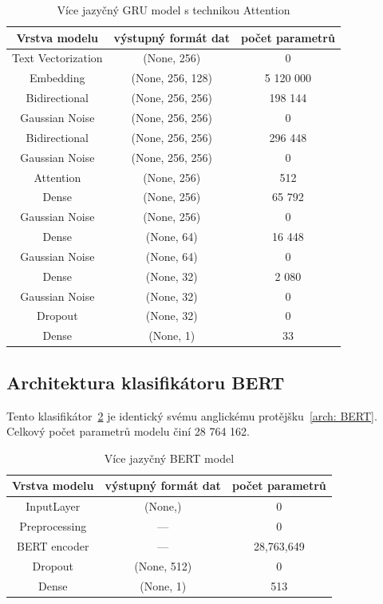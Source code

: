 \begin{table}[H]
	\centering
	\caption{Více jazyčný GRU model s technikou Attention}\label{tab:MULTI GRU Attention model}
	\begin{tabular}{ c c c }
			\toprule
			Vrstva modelu & výstupný formát dat & počet parametrů\\
			\midrule
            Text Vectorization & (None, 256) & 0\\         
            Embedding & (None, 256, 128) & 5 120 000\\   
            Bidirectional & (None, 256, 256) & 198 144\\    
			Gaussian Noise & (None, 256, 256) & 0\\
            Bidirectional & (None, 256, 256) & 296 448\\
			Gaussian Noise & (None, 256, 256) & 0\\
			Attention & (None, 256) & 512\\
            Dense & (None, 256) & 65 792\\ 
			Gaussian Noise & (None, 256) & 0\\
			Dense & (None, 64) & 16 448\\ 
			Gaussian Noise & (None, 64) & 0\\
			Dense & (None, 32) & 2 080\\ 
			Gaussian Noise & (None, 32) & 0\\
            Dropout & (None, 32) & 0\\   
            Dense & (None, 1) & 33\\ 
			\midrule
		\end{tabular}
\end{table}


\subsection{Architektura klasifikátoru BERT}
Tento klasifikátor~\ref{tab:MULTI BERT model} je identický svému anglickému protějšku~\ref{arch: BERT}.
Celkový počet parametrů modelu činí 28 764 162.

\begin{table}[H]
	\centering
	\caption{Více jazyčný BERT model}\label{tab:MULTI BERT model}
	\begin{tabular}{ c c c }
			\toprule
			Vrstva modelu & výstupný formát dat & počet parametrů\\
			\midrule
            InputLayer & (None,) & 0\\         
            Preprocessing & --- & 0\\   
            BERT encoder & --- & 28,763,649\\    
            Dropout & (None, 512) & 0\\  
            Dense & (None, 1) & 513\\ 
			\midrule
		\end{tabular}
\end{table}

